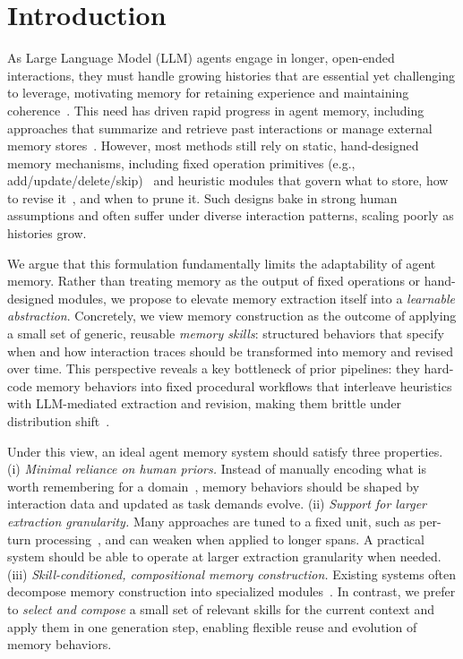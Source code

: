 \section{Introduction}





As Large Language Model (LLM) agents engage in longer, open-ended interactions, they must handle growing histories that are essential yet challenging to leverage, motivating memory for retaining experience and maintaining coherence~\citep{hu2025memory}.
This need has driven rapid progress in agent memory, including approaches that summarize and retrieve past interactions or manage external memory stores~\citep{kang2025memory, chhikara2025mem0, packer2023memgpt, xu2025mem}. 
However, most methods still rely on static, hand-designed memory mechanisms, including fixed operation primitives (e.g., add/update/delete/skip)~\citep{wang2025mem, yan2025memory} and heuristic modules that govern what to store, how to revise it~\citep{kang2025memory, fang2025lightmem}, and when to prune it. Such designs bake in strong human assumptions and often suffer under diverse interaction patterns, scaling poorly as histories grow.




We argue that this formulation fundamentally limits the adaptability of agent memory.
Rather than treating memory as the output of fixed operations or hand-designed modules, we propose to elevate memory extraction itself into a \emph{learnable abstraction}.
Concretely, we view memory construction as the outcome of applying a small set of generic, reusable \emph{memory skills}: structured behaviors that specify when and how interaction traces should be transformed into memory and revised over time.
This perspective reveals a key bottleneck of prior pipelines: they hard-code memory behaviors into fixed procedural workflows that interleave heuristics with LLM-mediated extraction and revision, making them brittle under distribution shift~\citep{fang2025lightmem}.


Under this view, an ideal agent memory system should satisfy three properties.
(i) \textit{Minimal reliance on human priors.}
Instead of manually encoding what is worth remembering for a domain~\citep{zhong2024memorybank}, memory behaviors should be shaped by interaction data and updated as task demands evolve.
(ii) \textit{Support for larger extraction granularity.}
Many approaches are tuned to a fixed unit, such as per-turn processing~\citep{fang2025lightmem}, and can weaken when applied to longer spans.
A practical system should be able to operate at larger extraction granularity when needed.
(iii) \textit{Skill-conditioned, compositional memory construction.}
Existing systems often decompose memory construction into specialized modules~\citep{kang2025memory}.
In contrast, we prefer to \emph{select and compose} a small set of relevant skills for the current context and apply them in one generation step, enabling flexible reuse and evolution of memory behaviors.





